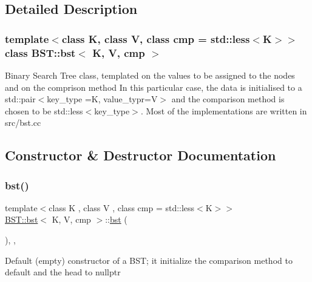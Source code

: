 \subsection{Detailed Description}
\subsubsection*{template$<$class K, class V, class cmp = std\+::less$<$\+K$>$$>$\newline
class B\+S\+T\+::bst$<$ K, V, cmp $>$}

Binary Search Tree class, templated on the values to be assigned to the nodes and on the comprison method In this particular case, the data is initialised to a std\+::pair$<$key\+\_\+type =K, value\+\_\+typr=V$>$ and the comparison method is chosen to be std\+::less$<$key\+\_\+type$>$. Most of the implementations are written in src/bst.\+cc 

\subsection{Constructor \& Destructor Documentation}
\mbox{\label{classBST_1_1bst_a4e9627986dc492f5b5ca99d81073cbae}} 
\subsubsection{\texorpdfstring{bst()}{bst()}\hspace{0.1cm}{\footnotesize\ttfamily [1/3]}}
{\footnotesize\ttfamily template$<$class K , class V , class cmp  = std\+::less$<$\+K$>$$>$ \\
\hyperlink{classBST_1_1bst}{B\+S\+T\+::bst}$<$ K, V, cmp $>$\+::\hyperlink{classBST_1_1bst}{bst} (\begin{DoxyParamCaption}{ }\end{DoxyParamCaption})\hspace{0.3cm}{\ttfamily [inline]}, {\ttfamily [explicit]}, {\ttfamily [noexcept]}}

Default (empty) constructor of a B\+ST; it initialize the comparison method to default and the head to nullptr \mbox{\label{classBST_1_1bst_a2e920ad809f46ab051c9f49d5108bc70}} 
